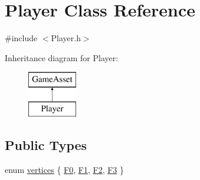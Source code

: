 \hypertarget{classPlayer}{\section{Player Class Reference}
\label{classPlayer}
}


{\ttfamily \#include $<$Player.\-h$>$}

Inheritance diagram for Player\-:\begin{figure}[H]
\begin{center}
\leavevmode
\includegraphics[height=2.000000cm]{classPlayer}
\end{center}
\end{figure}
\subsection*{Public Types}
\begin{DoxyCompactItemize}
\item 
enum \hyperlink{classPlayer_a861f91cf755f14d4d7001edbc1c79980}{vertices} \{ \hyperlink{classPlayer_a861f91cf755f14d4d7001edbc1c79980aa7d37123327782f87ebdfc1603947128}{F0}, 
\hyperlink{classPlayer_a861f91cf755f14d4d7001edbc1c79980a1fc1b1ec99eda01d44d9db82506f8d38}{F1}, 
\hyperlink{classPlayer_a861f91cf755f14d4d7001edbc1c79980a4cf8b3b1f9c2d77553f516a958f74298}{F2}, 
\hyperlink{classPlayer_a861f91cf755f14d4d7001edbc1c79980a369182dcb6e960c07f8d437ef59364df}{F3}
 \}
\end{DoxyCompactItemize}
